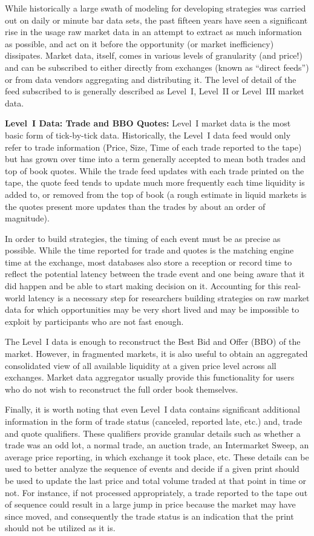 While historically a large swath of modeling for developing strategies was carried out on daily or minute bar data sets, the past fifteen years have seen a significant rise in the usage raw market data in an attempt to extract as much information as possible, and act on it before the opportunity (or market inefficiency) dissipates. Market data, itself, comes in various levels of granularity (and price!) and can be subscribed to either directly from exchanges (known as ``direct feeds'') or from data vendors aggregating and distributing it. The level of detail of the feed subscribed to is generally described as Level~I, Level~II or Level~III market data.\twomedskip


\noindent\textbf{Level~I Data: Trade and BBO Quotes:} Level~I market data is the most basic form of tick-by-tick data. Historically, the Level~I data feed would only refer to trade information (Price, Size, Time of each trade reported to the tape) but has grown over time into a term generally accepted to mean both trades and top of book quotes. While the trade feed updates with each trade printed on the tape, the quote feed tends to update much more frequently each time liquidity is added to, or removed from the top of book (a rough estimate in liquid markets is the quotes present more updates than the trades by about an order of magnitude). 


In order to build strategies, the timing of each event must be as precise as possible. While the time reported for trade and quotes is the matching engine time at the exchange, most databases also store a reception or record time to reflect the potential latency between the trade event and one being aware that it did happen and be able to start making decision on it. Accounting for this real-world latency is a necessary step for researchers building strategies on raw market data for which opportunities may be very short lived and may be impossible to exploit by participants who are not fast enough.


The Level~I data is enough to reconstruct the Best Bid and Offer (BBO) of the market. However, in fragmented markets,\label{in:fragmented} it is also useful to obtain an aggregated consolidated view of all available liquidity at a given price level across all exchanges. Market data aggregator usually provide this functionality for users who do not wish to reconstruct the full order book themselves. 


Finally, it is worth noting that even Level~I data contains significant additional information in the form of trade status (canceled, reported late, etc.) and, trade and quote qualifiers. These qualifiers provide granular details such as whether a trade was an odd lot, a normal trade, an auction trade, an Intermarket Sweep, an average price reporting, in which exchange it took place, etc. These details can be used to better analyze the sequence of events and decide if a given print should be used to update the last price and total volume traded at that point in time or not. For instance, if not processed appropriately, a trade reported to the tape out of sequence could result in a large jump in price because the market may have since moved, and consequently the trade status is an indication that the print should not be utilized as it is.


